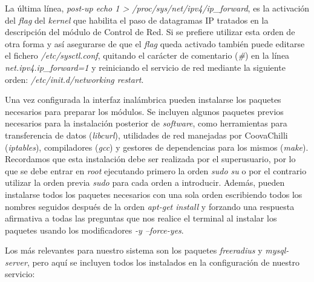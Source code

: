 
La última línea, \emph{post-up echo 1 > /proc/sys/net/ipv4/ip\_forward}, es la activación del \emph{flag} del \emph{kernel} que habilita el paso de datagramas IP tratados en la descripción del módulo de Control de Red. Si se prefiere utilizar esta orden de otra forma y así asegurarse de que el \emph{flag} queda activado también puede editarse el fichero \emph{/etc/sysctl.conf}, quitando el carácter de comentario (\emph{\#}) en la línea \emph{net.ipv4.ip\_forward=1} y reiniciando el servicio de red mediante la siguiente orden: \emph{/etc/init.d/networking restart}.

Una vez configurada la interfaz inalámbrica pueden instalarse los paquetes necesarios para preparar los módulos. Se incluyen algunos paquetes previos necesarios para la instalación posterior de \emph{software}, como herramientas para transferencia de datos (\emph{libcurl}), utilidades de red manejadas por CoovaChilli (\emph{iptables}), compiladores (\emph{gcc}) y gestores de dependencias para los mismos (\emph{make}). Recordamos que esta instalación debe ser realizada por el superusuario, por lo que se debe entrar en \emph{root} ejecutando primero la orden \emph{sudo su} o por el contrario utilizar la orden previa \emph{sudo} para cada orden a introducir. Además, pueden instalarse todos los paquetes necesarios con una sola orden escribiendo todos los nombres seguidos después de la orden \emph{apt-get install} y forzando una respuesta afirmativa a todas las preguntas que nos realice el terminal al instalar los paquetes usando los modificadores \emph{-y --force-yes}.

Los más relevantes para nuestro sistema son los paquetes \emph{freeradius} y \emph{mysql-server}, pero aquí se incluyen todos los instalados en la configuración de nuestro servicio:


